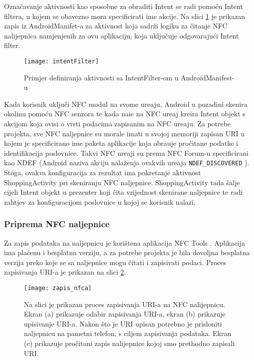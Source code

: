 Ozna\v{c}avanje aktivnosti kao sposobne za obraditi Intent se radi pomo\'{c}u Intent filtera, u kojem se obavezno mora specificirati ime akcije. Na slici \ref{fig:intentFilter} je prikazan zapis iz AndroidManifet-a za aktivnost koja sadr\v{z}i logiku za \v{c}itanje NFC nalijepnica namjenjenih za ovu aplikaciju, koja uklju\v{c}uje odgovaraju\'{c}i Intent filter.

\begin{figure}[!htbp]
	\begin{center}
 \texttt{[image: intentFilter]}
 \caption{Primjer definiranja aktivnosti sa IntentFilter-om u AndroidManifest-u}
 \label{fig:intentFilter}
	\end{center}
\end{figure}

Kada korisnik uklju\v{c}i NFC modul na svome ure\dj aju, Android u pozadini skenira okolinu pomo\'{c}u NFC senzora te kada nai\dj e na NFC ure\dj aj kreira Intent objekt s akcijom koja ovisi o vrsti podacima zapisanim na NFC ure\dj aju. Za potrebe projekta, sve NFC naljepnice su morale imati u svojoj memoriji zapisan URI u kojem je specificirano ime paketa aplikacije koja obra\dj uje pro\v{c}itane podatke i identifikacija poslovnice. Takvi NFC ure\dj aji su prema NFC Forum-u specificirani kao NDEF \cite{NdefMessage} (Android naziva akciju nala\v{z}enja ovakvih ure\dj aja \verb|NDEF_DISCOVERED| \cite{ndef_discovered}).
Stoga, ovakva konfiguracija za rezultat ima pokretanje aktivnost ShoppingActivity pri skeniranju NFC naljepnice. ShoppingActivity tada \v{s}alje cijeli Intent objekt u prezenter koji \v{c}ita vrijednost skenirane naljepnice te radi zahtjev za konfiguracijom poslovnice u kojoj se korisnik nalazi.

\subsubsection{Priprema NFC naljepnice}
Za zapis podataka na naljepnicu je kori\v{s}tena aplikacija NFC Tools \cite{nfcTools}. Aplikacija ima pla\'{c}enu i besplatnu verziju, a za potrebe projekta je bila dovoljna besplatna verzija preko koje se sa naljepnice mogu \v{c}itati i zapisivati podaci. Proces zapisivanja URI-a je prikazan na slici \ref{fig:zapisNfca}.


\begin{figure}[!htbp]
	\begin{center}
 \texttt{[image: zapis\_nfca]}
 \caption{Na slici je prikazan proces zapisivanja URI-a na NFC nalijepnicu. Ekran (a) prikazuje odabir zapisivanja URI-a, ekran (b) prikazuje upisivanje URI-a. Nakon \v{s}to je URI upisan potrebno je prisloniti naljepnicu na pametni telefon, s ciljem zapisivanja podataka. Ekran (c) prikazuje pro\v{c}itani zapis nalijepnice kojoj smo prethodno zapisali URI.}
 \label{fig:zapisNfca}
	\end{center}
\end{figure}

